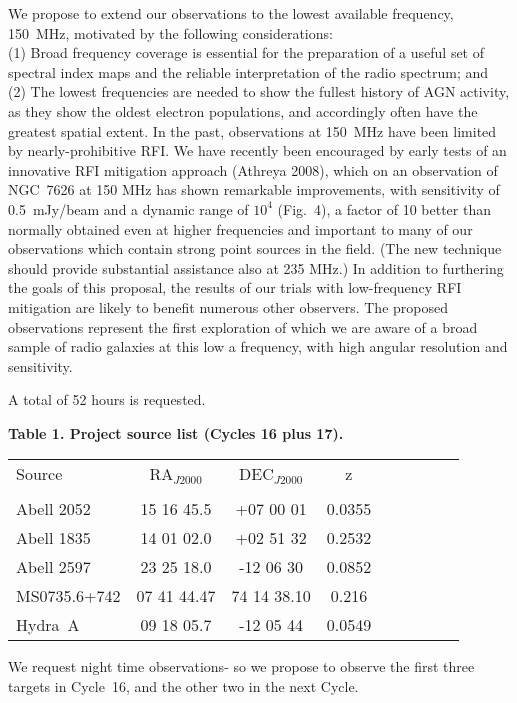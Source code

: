 \documentclass{article}
\begin{document}
We propose to extend our observations to the lowest available
frequency, 150~MHz, motivated by the following considerations:\\ (1)
Broad frequency coverage is essential for the preparation of a useful
set of spectral index maps and the reliable interpretation of the
radio spectrum; and \\ (2) The lowest frequencies are needed to show
the fullest history of AGN activity, as they show the oldest electron
populations, and accordingly often have the greatest spatial extent.
In the past, observations at 150~MHz have been limited by
nearly-prohibitive RFI.  We have recently been encouraged by early
tests of an innovative RFI mitigation approach (Athreya 2008), which
on an observation of NGC~7626 at 150 MHz has shown remarkable
improvements, with sensitivity of 0.5~mJy/beam and a dynamic range of
$10^4$ (Fig.~4), a factor of 10 better than normally obtained even at
higher frequencies and important to many of our observations which
contain strong point sources in the field. (The new technique should
provide substantial assistance also at 235 MHz.)  In addition to
furthering the goals of this proposal, the results of our trials with
low-frequency RFI mitigation are likely to benefit numerous other
observers.  The proposed observations represent the first exploration
of which we are aware of a broad sample of radio galaxies at this low
a frequency, with high angular resolution and sensitivity.

A total of 52 hours is requested.

\vfill\eject

{\centerline {\bf Table 1. Project source list (Cycles 16 plus 17). }}

\begin{center}
\begin{tabular}{lccccrccc}
\hline
Source & RA$_{J2000}$ & DEC$_{J2000}$ & z \\
       &              &               &   \\
\hline

Abell 2052  & 15 16 45.5& +07 00 01 & 0.0355 \\
Abell 1835  & 14 01 02.0& +02 51 32 & 0.2532\\
Abell 2597  &23 25 18.0& -12 06 30 & 0.0852 \\
\hline
MS0735.6+742 & 07 41 44.47 & 74 14 38.10  & 0.216 \\
Hydra~A  & 09 18 05.7 & -12 05 44 & 0.0549 \\

\hline
\end{tabular}
\end{center}
We request night time observations- so we propose to observe
the first three targets in Cycle~16, and the other two in the
next Cycle.
\medskip
\end{document}
